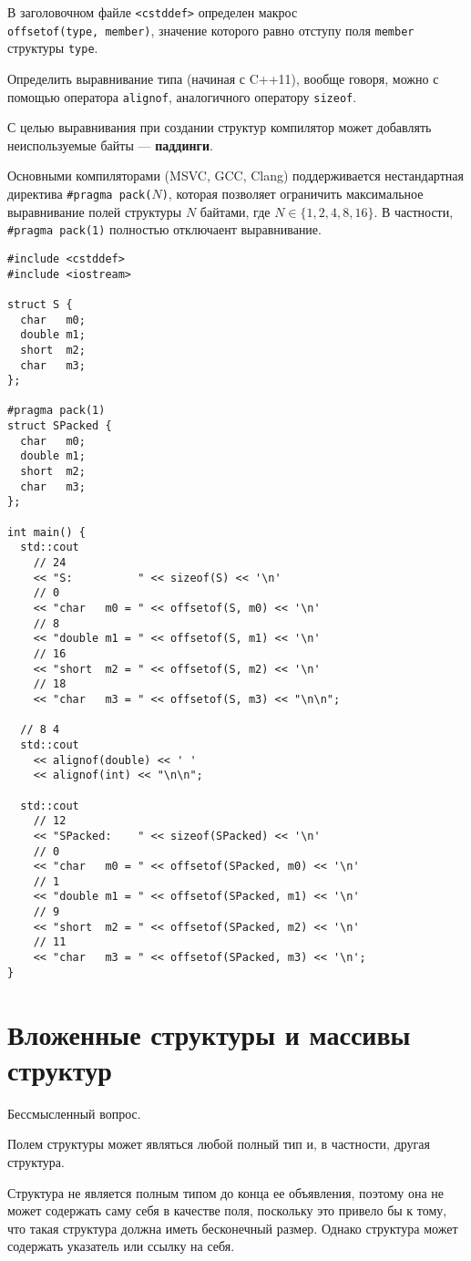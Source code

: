 \documentclass[14pt, a4paper]{extarticle}
\begin{document}
В заголовочном файле \verb|<cstddef>| определен макрос\\ \verb|offsetof(type, member)|,
значение которого равно отступу поля \verb|member| структуры \verb|type|.

Определить выравнивание типа (начиная с C++11), вообще говоря, можно с помощью
оператора \verb|alignof|, аналогичного оператору \verb|sizeof|.

С целью выравнивания при создании структур компилятор может добавлять
неиспользуемые байты --- \textbf{паддинги}.

Основными компиляторами (MSVC, GCC, Clang) поддерживается нестандартная директива
\verb|#pragma pack(|$N$\verb|)|, которая позволяет ограничить максимальное
выравнивание полей структуры $N$ байтами, где $N \in \{1,2,4,8,16\}$.
В частности, \verb|#pragma pack(1)| полностью отключаент выравнивание.

\begin{verbatim}
#include <cstddef>
#include <iostream>
  
struct S {
  char   m0;
  double m1;
  short  m2;
  char   m3;
};

#pragma pack(1)
struct SPacked {
  char   m0;
  double m1;
  short  m2;
  char   m3;
};
  
int main() {
  std::cout
    // 24
    << "S:          " << sizeof(S) << '\n'
    // 0
    << "char   m0 = " << offsetof(S, m0) << '\n'
    // 8
    << "double m1 = " << offsetof(S, m1) << '\n'
    // 16
    << "short  m2 = " << offsetof(S, m2) << '\n'
    // 18
    << "char   m3 = " << offsetof(S, m3) << "\n\n";

  // 8 4
  std::cout
    << alignof(double) << ' '
    << alignof(int) << "\n\n";

  std::cout
    // 12
    << "SPacked:    " << sizeof(SPacked) << '\n'
    // 0
    << "char   m0 = " << offsetof(SPacked, m0) << '\n'
    // 1
    << "double m1 = " << offsetof(SPacked, m1) << '\n'
    // 9
    << "short  m2 = " << offsetof(SPacked, m2) << '\n'
    // 11
    << "char   m3 = " << offsetof(SPacked, m3) << '\n';
}
\end{verbatim}

\section{Вложенные структуры и массивы структур}
Бессмысленный вопрос.

Полем структуры может являться любой полный тип и, в частности, другая структура.

Структура не является полным типом до конца ее объявления, поэтому она не может
содержать саму себя в качестве поля, поскольку это привело бы к тому, что такая
структура должна иметь бесконечный размер. Однако структура может содержать
указатель или ссылку на себя.
\end{document}
